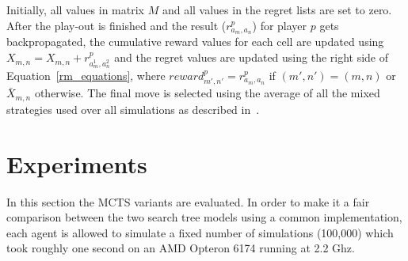 \documentclass{article}
\begin{document}


Initially, all values in matrix $M$ and all values in the regret lists are set to zero. After the play-out is finished and the result ($r^{p}_{a_{m},a_{n}}$) for player $p$ gets backpropagated, the cumulative reward values for each cell are updated using $X_{m,n} = X_{m,n} + r^{p}_{a^{1}_{m},a^{2}_{n}}$ and the regret values are updated using the right side of Equation~\ref{rm_equations},
where $reward^p_{m',n'} = r^p_{a_m,a_n}$ if $(m',n') = (m,n)$ or $\bar{X}_{m,n}$ otherwise.
The final move is selected using the average of all the mixed strategies used over all simulations as described in~\cite{mcts_goofspiel}. 




\section{Experiments}
\label{sec:experiments}

In this section the MCTS variants are evaluated. 
In order to make it a fair comparison between the two search tree models using a common implementation, each agent is allowed to simulate a fixed number of simulations (100,000) which took roughly one second on an AMD Opteron 6174 running at 2.2 Ghz.
\end{document}
